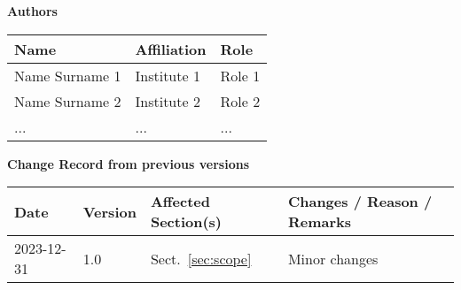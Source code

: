 \documentclass[12pt,a4paper]{article}
\begin{document}



\newpage
\pagestyle{fancy}

\noindent
{\Large \bf Authors}
\medskip

\noindent
\begin{tabularx}{\textwidth}{|l|X|X|}
  \hline
      \rowcolor{lightgray} {\bf Name} & {\bf Affiliation} & {\bf Role}\\
      \hline
      Name Surname 1     & Institute 1 & Role 1\\ \hline
      Name Surname 2     & Institute 2 & Role 2\\ \hline
      ...                & ...         & ...   \\ \hline
\end{tabularx}

\vspace{3cm}

\noindent
{\Large \bf Change Record from previous versions}
\medskip

\noindent
\begin{tabularx}{\textwidth}{|l|l|l|X|}
  \hline
      \rowcolor{lightgray} {\bf Date} & {\bf Version} & {\bf Affected Section(s)} & {\bf Changes / Reason / Remarks}\\  \hline
      2023-12-31 & 1.0 & Sect.~\ref{sec:scope} &  Minor changes \\ \hline
\end{tabularx}


\newpage
\tableofcontents \thispagestyle{fancy}


\newpage





\newpage
\listofreq \thispagestyle{fancy}

\listofquestion \thispagestyle{fancy}


\label{LastPage}  %
\end{document}
